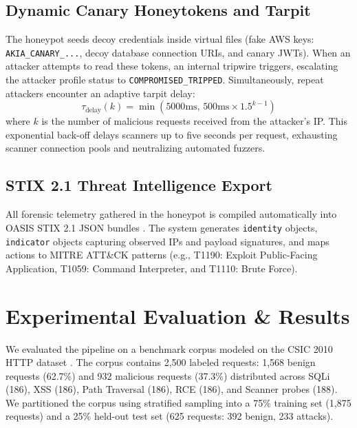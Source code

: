 \documentclass[conference]{IEEEtran}
\begin{document}
\subsection{Dynamic Canary Honeytokens and Tarpit}
The honeypot seeds decoy credentials inside virtual files (fake AWS keys: \texttt{AKIA\_CANARY\_...}, decoy database connection URIs, and canary JWTs). When an attacker attempts to read these tokens, an internal tripwire triggers, escalating the attacker profile status to \texttt{COMPROMISED\_TRIPPED}. Simultaneously, repeat attackers encounter an adaptive tarpit delay:
\begin{equation}
\tau_{\text{delay}}(k) = \min\left(5000\text{ms},\, 500\text{ms} \times 1.5^{k - 1}\right)
\end{equation}
where $k$ is the number of malicious requests received from the attacker's IP. This exponential back-off delays scanners up to five seconds per request, exhausting scanner connection pools and neutralizing automated fuzzers.

\subsection{STIX 2.1 Threat Intelligence Export}
All forensic telemetry gathered in the honeypot is compiled automatically into OASIS STIX 2.1 JSON bundles \cite{oasis2021}. The system generates \texttt{identity} objects, \texttt{indicator} objects capturing observed IPs and payload signatures, and maps actions to MITRE ATT\&CK patterns (e.g., T1190: Exploit Public-Facing Application, T1059: Command Interpreter, and T1110: Brute Force).

\section{Experimental Evaluation \& Results}
We evaluated the pipeline on a benchmark corpus modeled on the CSIC 2010 HTTP dataset \cite{torrano2010}. The corpus contains 2,500 labeled requests: 1,568 benign requests (62.7\%) and 932 malicious requests (37.3\%) distributed across SQLi (186), XSS (186), Path Traversal (186), RCE (186), and Scanner probes (188). We partitioned the corpus using stratified sampling into a 75\% training set (1,875 requests) and a 25\% held-out test set (625 requests: 392 benign, 233 attacks).
\end{document}

